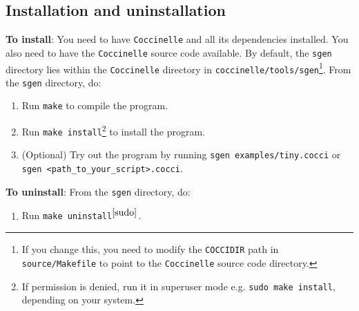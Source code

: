 \subsection{Installation and uninstallation}
\textbf{To install}: You need to have \texttt{Coccinelle} and all its dependencies installed. You also need to have the \texttt{Coccinelle} source code available. By default, the \texttt{sgen} directory lies within the \texttt{Coccinelle} directory in \texttt{coccinelle/tools/sgen}\footnote{If you change this, you need to modify the \texttt{COCCIDIR} path in \texttt{source/Makefile} to point to the \texttt{Coccinelle} source code directory.}. From the \texttt{sgen} directory, do:
\begin{enumerate}
\item Run \texttt{make} to compile the program.
\item Run \texttt{make install}\footnote{If permission is denied, run it in superuser mode e.g. \texttt{sudo make install}, depending on your system.\label{sudo}} to install the program.
\item (Optional) Try out the program by running \texttt{sgen examples/tiny.cocci} or \texttt{sgen <path\_to\_your\_script>.cocci}.
\end{enumerate}
\textbf{To uninstall}: From the \texttt{sgen} directory, do:
\begin{enumerate}
\item Run \texttt{make uninstall}$^{\ref{sudo}}$. 
\end{enumerate}
\bigskip

